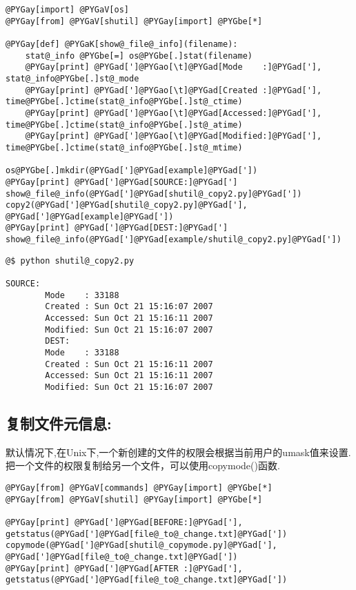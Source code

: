 \documentclass[a4paper,10pt,english]{manual}
\begin{document}
\begin{Verbatim}[commandchars=@\[\]]
@PYGay[import] @PYGaV[os]
@PYGay[from] @PYGaV[shutil] @PYGay[import] @PYGbe[*]

@PYGay[def] @PYGaK[show@_file@_info](filename):
    stat@_info @PYGbe[=] os@PYGbe[.]stat(filename)
    @PYGay[print] @PYGad[']@PYGao[\t]@PYGad[Mode    :]@PYGad['], stat@_info@PYGbe[.]st@_mode
    @PYGay[print] @PYGad[']@PYGao[\t]@PYGad[Created :]@PYGad['], time@PYGbe[.]ctime(stat@_info@PYGbe[.]st@_ctime)
    @PYGay[print] @PYGad[']@PYGao[\t]@PYGad[Accessed:]@PYGad['], time@PYGbe[.]ctime(stat@_info@PYGbe[.]st@_atime)
    @PYGay[print] @PYGad[']@PYGao[\t]@PYGad[Modified:]@PYGad['], time@PYGbe[.]ctime(stat@_info@PYGbe[.]st@_mtime)

os@PYGbe[.]mkdir(@PYGad[']@PYGad[example]@PYGad['])
@PYGay[print] @PYGad[']@PYGad[SOURCE:]@PYGad[']
show@_file@_info(@PYGad[']@PYGad[shutil@_copy2.py]@PYGad['])
copy2(@PYGad[']@PYGad[shutil@_copy2.py]@PYGad['], @PYGad[']@PYGad[example]@PYGad['])
@PYGay[print] @PYGad[']@PYGad[DEST:]@PYGad[']
show@_file@_info(@PYGad[']@PYGad[example/shutil@_copy2.py]@PYGad['])
\end{Verbatim}

\begin{Verbatim}[commandchars=@\[\]]
@$ python shutil@_copy2.py

SOURCE:
        Mode    : 33188
        Created : Sun Oct 21 15:16:07 2007
        Accessed: Sun Oct 21 15:16:11 2007
        Modified: Sun Oct 21 15:16:07 2007
        DEST:
        Mode    : 33188
        Created : Sun Oct 21 15:16:11 2007
        Accessed: Sun Oct 21 15:16:11 2007
        Modified: Sun Oct 21 15:16:07 2007
\end{Verbatim}


\subsection{复制文件元信息:}

默认情况下,在Unix下,一个新创建的文件的权限会根据当前用户的umask值来设置.把一个文件的权限复制给另一个文件，可以使用copymode()函数.

\begin{Verbatim}[commandchars=@\[\]]
@PYGay[from] @PYGaV[commands] @PYGay[import] @PYGbe[*]
@PYGay[from] @PYGaV[shutil] @PYGay[import] @PYGbe[*]

@PYGay[print] @PYGad[']@PYGad[BEFORE:]@PYGad['], getstatus(@PYGad[']@PYGad[file@_to@_change.txt]@PYGad['])
copymode(@PYGad[']@PYGad[shutil@_copymode.py]@PYGad['], @PYGad[']@PYGad[file@_to@_change.txt]@PYGad['])
@PYGay[print] @PYGad[']@PYGad[AFTER :]@PYGad['], getstatus(@PYGad[']@PYGad[file@_to@_change.txt]@PYGad['])
\end{Verbatim}
\end{document}
